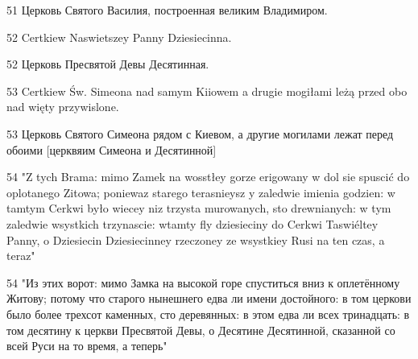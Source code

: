 51 Церковь Святого Василия, построенная великим Владимиром.

52 Certkiew Naswietszey Panny Dziesiecinna.

52 Церковь Пресвятой Девы Десятинная.

53 Certkiew Św. Simeona nad samym Kiiowem a drugie mogiłami leżą przed obo nad więty przywislone.

53 Церковь Святого Симеона рядом с Киевом, а другие могилами лежат перед обоими [церквяим Симеона и Десятинной] 


54 "Z tych Brama: mimo Zamek na wosstłey gorze erigowany w dol sie spuscić do oplotanego Zitowa; poniewaz starego terasnieysz y zaledwie imienia godzien: w tamtym Cerkwi było wiecey niz trzysta murowanych, sto drewnianych: w tym zaledwie wsystkich trzynascie: wtamty fly dziesieciny do Cerkwi Taswiéltey Panny, o Dziesiecin Dziesiecinney rzeczoney ze wsystkiey Rusi na ten czas, a teraz"


54 "Из этих ворот: мимо Замка на высокой горе спуститься вниз к оплетённому Житову; потому что старого нынешнего едва ли имени достойного: в том церкови было более трехсот каменных, сто деревянных: в этом едва ли всех тринадцать: в том десятину к церкви Пресвятой Девы, о Десятине Десятинной, сказанной со всей Руси на то время, а теперь"

